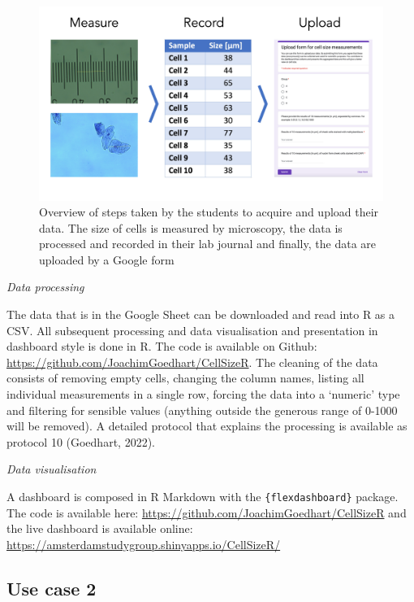 \documentclass[
]{agujournal2019}
\begin{document}
\begin{figure}

{\centering \includegraphics{images/Students-side-english.png}

}

\caption{\label{fig-students-side}Overview of steps taken by the
students to acquire and upload their data. The size of cells is measured
by microscopy, the data is processed and recorded in their lab journal
and finally, the data are uploaded by a Google form}

\end{figure}

\emph{Data processing}

The data that is in the Google Sheet can be downloaded and read into R
as a CSV. All subsequent processing and data visualisation and
presentation in dashboard style is done in R. The code is available on
Github: \url{https://github.com/JoachimGoedhart/CellSizeR}. The cleaning
of the data consists of removing empty cells, changing the column names,
listing all individual measurements in a single row, forcing the data
into a `numeric' type and filtering for sensible values (anything
outside the generous range of 0-1000 will be removed). A detailed
protocol that explains the processing is available as protocol 10
(Goedhart, 2022).

\emph{Data visualisation}

A dashboard is composed in R Markdown with the
\texttt{\{flexdashboard\}} package. The code is available here:
\url{https://github.com/JoachimGoedhart/CellSizeR} and the live
dashboard is available online:
\url{https://amsterdamstudygroup.shinyapps.io/CellSizeR/}

\hypertarget{use-case-2}{%
\subsection*{Use case 2}\label{use-case-2}}
\end{document}
